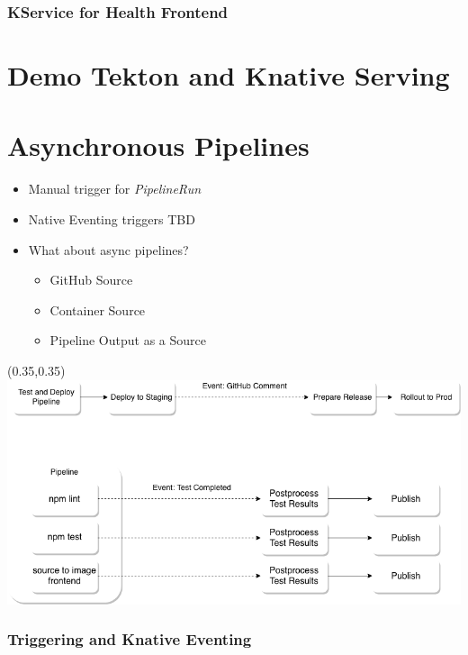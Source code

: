 \documentclass[aspectratio=169,11pt,hyperref={colorlinks=true}]{beamer}
\begin{document}
\begin{lblackrwhiteframe}
\begin{blackframe}
\begin{2columnsframe}
  {
  
  }
  {
  
  }
  \frametitle{KService for Health Frontend}
\end{2columnsframe}

\section{Demo Tekton and Knative Serving}

\section{Asynchronous Pipelines}

\begin{2columnsframe}
  {
  \begin{itemize}
    \item Manual trigger for {\em PipelineRun}
    \item Native Eventing triggers TBD
    \item What about async pipelines?
    \begin{itemize}
      \item GitHub Source
      \item Container Source
      \item Pipeline Output as a Source
    \end{itemize}
  \end{itemize}
  }
  {
  \begin{textblock*}{0.6\paperwidth}(0.35\paperwidth,0.35\paperheight)
    \centering
    \includegraphics[width=0.6\paperwidth]{img/async_pipelines.png}
  \end{textblock*}
  }
  \frametitle{Triggering and Knative Eventing}
\end{2columnsframe}


\end{blackframe}
\end{lblackrwhiteframe}
\end{document}
